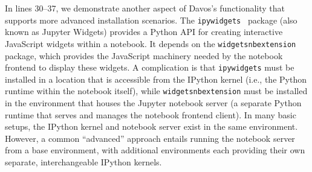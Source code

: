 \documentclass[preprint,12pt,a4paper]{elsarticle}
\begin{document}
In lines 30--37, we demonstrate another aspect of Davos's functionality that supports more advanced installation scenarios.
The \texttt{ipywidgets}~\cite{FredEtal15} package (also known as Jupyter Widgets) provides a Python API for creating interactive JavaScript widgets within a notebook. 
It depends on the \texttt{widgetsnbextension} package, which provides the JavaScript machinery needed by the notebook frontend to display these widgets.
A complication is that \texttt{ipywidgets} must be installed in a location that is accessible from the IPython kernel (i.e., the Python runtime within the notebook itself), while \texttt{widgetsnbextension} must be installed in the environment that houses the Jupyter notebook server (a separate Python runtime that serves and manages the notebook frontend client). 
In many basic setups, the IPython kernel and notebook server exist in the same environment. 
However, a common ``advanced'' approach entails running the notebook server from a base environment, with additional environments each providing their own separate, interchangeable IPython kernels.  
\end{document}
